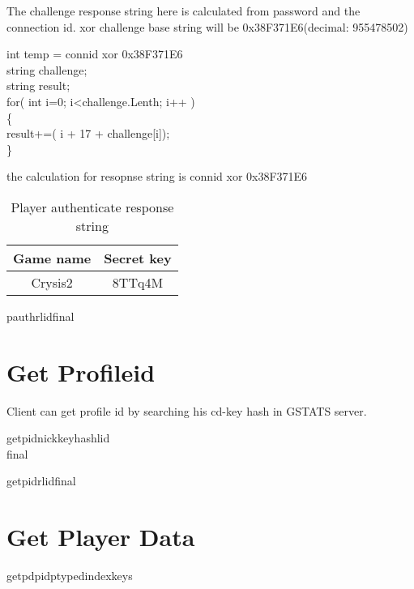\documentclass[oneside,titlepage,a4paper]{Definition/retrospy} %
\begin{document}
The challenge response string here is calculated from password and the connection id.
xor challenge base string will be 0x38F371E6(decimal: 955478502)
\begin{mybox}
int temp = connid xor 0x38F371E6\\
string challenge;\\
string result;\\
for( int i=0; i<challenge.Lenth; i++ )\\
\{\\
	result+=( i + 17 + challenge[i]);\\
\}
\end{mybox}
the calculation for resopnse string is connid xor 0x38F371E6
\begin{table}[H]
	\centering
	\begin{tabular}{|c|c|}
		\hline
		\textbf{Game name}&\textbf{Secret key}\\\hline
		Crysis2&8TTq4M\\\hline
	\end{tabular}
	\caption{Player authenticate response string}
	\label{Player authenticate response string}
\end{table}

\ServerResponse

\begin{mybox}[label = gstats player auth server response]
	\tbs pauthr\tbs <profile id>\tbs lid\tbs <local id>\tbs final\tbs
\end{mybox}



\section{Get Profileid}
Client can get profile id by searching his cd-key hash in GSTATS server.
\ClientRequest
\begin{mybox}
	\tbs getpid\tbs\tbs nick\tbs <nick name>\tbs keyhash\tbs<cd key hash>\tbs lid\tbs <local id>\\\tbs final\tbs
\end{mybox}

\ServerResponse

\begin{mybox}
	\tbs getpidr\tbs <profile id>\tbs lid\tbs<local id>\tbs final\tbs
\end{mybox}

\section{Get Player Data}
\ClientRequest
\begin{mybox}
	\tbs getpd\tbs pid\tbs<profile id>\tbs ptype\tbs<persist storage type>\tbs dindex\tbs <data index>\tbs keys
\end{mybox}
\ServerResponse
\end{document}
